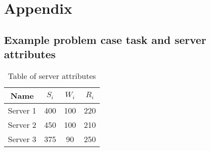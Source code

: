\section*{Appendix}

\subsection*{Example problem case task and server attributes}
\begin{table}[h]
    \begin{tabular}{|c|c|c|c|}
        \hline
        Name     & $S_i$ & $W_i$ & $R_i$ \\ [0.5ex] \hline
        Server 1 & 400   & 100   & 220   \\ \hline
        Server 2 & 450   & 100   & 210   \\ \hline
        Server 3 & 375   & 90    & 250   \\ \hline
    \end{tabular}
    \caption{Table of server attributes}
    \label{tab:example-servers-properties}
\end{table}

